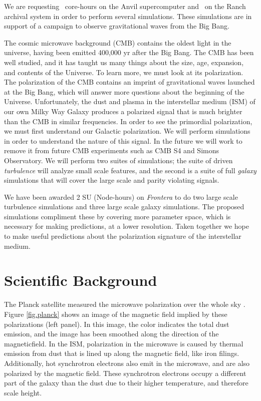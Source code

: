 

We are requesting \SUrequest\ core-hours on the Anvil supercomputer and \diskrequest\ on the Ranch archival system
in order to perform several simulations.  These simulations are in support of a
campaign to observe gravitational waves from the Big Bang.  


The cosmic microwave background (CMB) contains the oldest light in the universe,
having been emitted 400,000 yr after the Big Bang.  The CMB has been well
studied, and it has taught us many things
about the size, age, expansion, and contents of the Universe.  To learn more, we
must look at its polarization.  The polarization of the CMB contains an imprint
of gravitational waves launched at the Big Bang, which will answer more
questions about the beginning of the Universe.  Unfortunately, the dust and
plasma in the interstellar medium (ISM) of our own Milky Way
Galaxy produces a polarized signal that is much brighter than
the CMB in similar frequencies.  In order to see the primordial polarization, we must first understand
our Galactic polarization.  We will perform simulations in order to understand
the nature of this signal.  In the future we will work to remove it from future CMB experiments such as CMB
S4 and Simons Observatory.  We will perform two suites of simulations; the 
suite of driven \emph{turbulence} will analyze small scale features, and the second is
a suite of full \emph{galaxy} simulations that will cover the large scale and parity
violating signals.

We have been awarded 2 SU (Node-hours) on \emph{Frontera} to do two large
scale turbulence simulations and three large scale galaxy simulations.  The
proposed simulations compliment these by covering more parameter space, which is 
necessary for making predictions, at a lower resolution.  Taken together we hope
to make useful predictions about the polarization signature of the interstellar
medium.  



\section{Scientific Background}

The Planck satellite measured the microwave polarization over the whole sky
\citep{Planck18xi}.  Figure
\ref{fig.planck} shows an image of the magnetic field implied by these polarizations (left
panel).  In this image, the color indicates the total dust emission, and the
image has been smoothed along the direction of the magneticfield.   In the ISM, polarization in the microwave is caused by thermal emission
from dust that is lined up along the magnetic field, like iron filings.
Additionally, hot synchrotron electrons also emit in the microwave, and are also
polarized by the magnetic field. These synchrotron electrons occupy  a different part of the galaxy than
the dust due to their higher temperature, and therefore scale height.  


